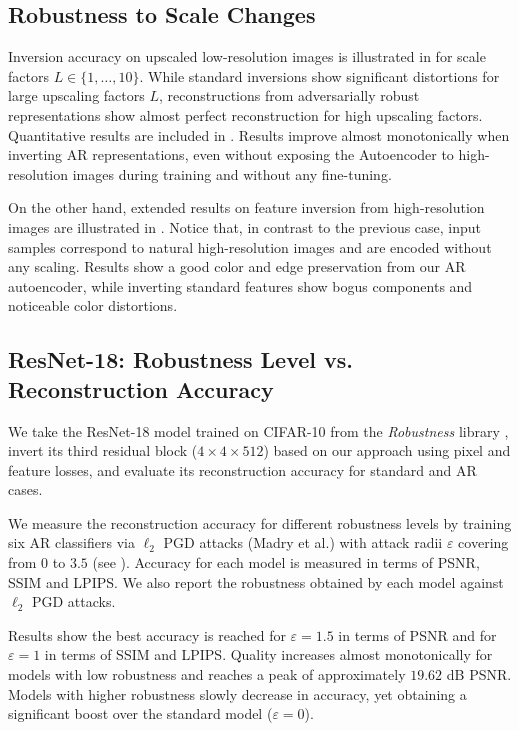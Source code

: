 \subsection{Robustness to Scale Changes}
\label{sec:supp_results_scale}
Inversion accuracy on upscaled low-resolution images is illustrated in  for scale factors $L\in \{1,\dots, 10\}$. While standard inversions show significant distortions for large upscaling factors $L$, reconstructions from adversarially robust representations show almost perfect reconstruction for high upscaling factors. Quantitative results are included in . Results improve almost monotonically when inverting AR representations, even without exposing the Autoencoder to high-resolution images during training and without any fine-tuning.

On the other hand, extended results on feature inversion from high-resolution images are illustrated in . Notice that, in contrast to the previous case, input samples correspond to natural high-resolution images and are encoded without any scaling. Results show a good color and edge preservation from our AR autoencoder, while inverting standard features show bogus components and noticeable color distortions.




\subsection{ResNet-18: Robustness Level vs. Reconstruction Accuracy}
\label{sec:supp_inverting_alternative}

We take the ResNet-18 model trained on CIFAR-10 from the \textit{Robustness} library \cite{robustness}, invert its third residual block ($4 \times 4 \times 512$) based on our approach using pixel and feature losses, and evaluate its reconstruction accuracy for standard and AR cases.

We measure the reconstruction accuracy for different robustness levels by training six AR classifiers via $\ell_{2}$ PGD attacks (Madry et al.) with attack radii $\varepsilon$ covering from $0$ to $3.5$ (see ). Accuracy for each model is measured in terms of PSNR, SSIM and LPIPS. We also report the robustness obtained by each model against $\ell_{2}$ PGD attacks.


Results show the best accuracy is reached for $\varepsilon=1.5$ in terms of PSNR and for $\varepsilon=1$ in terms of SSIM and LPIPS. Quality increases almost monotonically for models with low robustness and reaches a peak of approximately $19.62$ dB PSNR. Models with higher robustness slowly decrease in accuracy, yet obtaining a significant boost over the standard model ($\varepsilon=0$).

